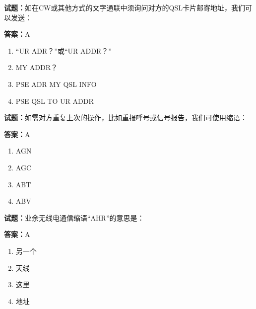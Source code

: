 \documentclass{ctexbook}
\begin{document}




\vspace{1em}

\textbf{试题：}如在CW或其他方式的文字通联中须询问对方的QSL卡片邮寄地址，我们可以发送： 

\textbf{答案：}A 

\begin{enumerate}[leftmargin=3em]
  \item “UR ADR？”或“UR ADDR？” 

  \item MY ADDR？ 

  \item PSE ADR MY QSL INFO 

  \item PSE QSL TO UR ADDR 

\end{enumerate}





\vspace{1em}

\textbf{试题：}如需对方重复上次的操作，比如重报呼号或信号报告，我们可使用缩语： 

\textbf{答案：}A 

\begin{enumerate}[leftmargin=3em]
  \item AGN 

  \item AGC 

  \item ABT 

  \item ABV 

\end{enumerate}





\vspace{1em}

\textbf{试题：}业余无线电通信缩语“AHR”的意思是： 

\textbf{答案：}A 

\begin{enumerate}[leftmargin=3em]
  \item 另一个 

  \item 天线 

  \item 这里 

  \item 地址 

\end{enumerate}
\end{document}
